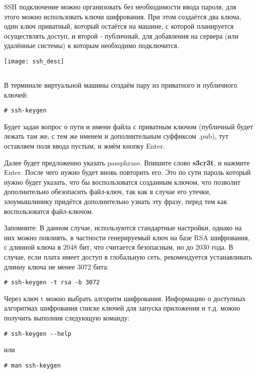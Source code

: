 SSH подключение можно организовать без необходимости ввода пароля, для этого можно использовать ключи шифрования. При этом создаётся два ключа, один ключ приватный, который остаётся на машине, с которой планируется осуществлять доступ, и второй - публичный, для добавления на сервера (или удалённые системы) к которым необходимо подключится.
\begin{center}
	\texttt{[image: ssh\_desc]}
\end{center}

\subsection{}В терминале виртуальной машины создаём пару из приватного и публичного ключей:
\begin{lstlisting}[style=bash]
# ssh-keygen
\end{lstlisting}

Будет задан вопрос о пути и имени файла с приватным ключом (публичный будет лежать там же, с тем же именем и дополнительным суффиксом .pub), тут оставляем поля ввода пустым, и жмём кнопку Enter.

Далее будет предложенно указать passphrase. Впишите слово \textbf{s3cr3t}\label{ssh:passphrase}, и нажмите Enter. После чего нужно будет вновь повторить его. Это по сути пароль который нужно будет указать, что бы воспользоватся созданным ключом, что позволит дополнительно обезопасить файл-ключ, так как в случае его утечки, злоумышлинику придётся дополнительно узнать эту фразу, перед тем как воспользоватся файл-ключом.  

\begin{Notes}{Запомните:}
	В данном случае, используются стандартные настройки, однако на них можно повлиять, в частности генерируемый ключ на базе RSA шифрования, с длинной ключа в 2048 бит, что считается безопасным, но до 2030 года. В случае, если плата имеет доступ в глобальную сеть, рекомендуется устанавливать длинну ключа не менее 3072 бита:
	\begin{lstlisting}[style=bash]
	# ssh-keygen -t rsa -b 3072
	\end{lstlisting}
	
	Через ключ t можно выбрать алгоритм шифрования. Информацию о доступных алгоритмах шифрования списке ключей для запуска приложения и т.д. можно получить выполнив следующую команду:
	\begin{lstlisting}[style=bash]
	# ssh-keygen --help
	\end{lstlisting}
	или
	\begin{lstlisting}[style=bash]
	# man ssh-keygen
	\end{lstlisting}
\end{Notes}


